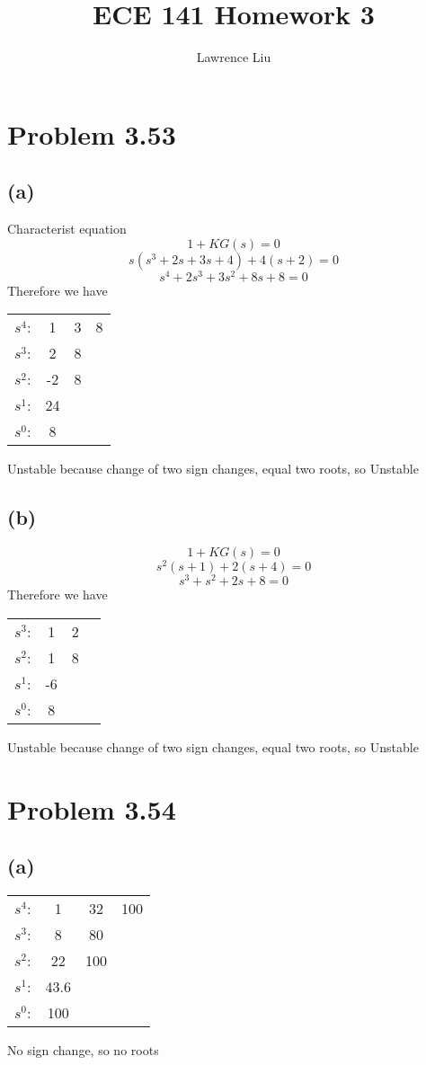 \documentclass[12pt]{article}
\title{ECE 141 Homework 3}
\author{Lawrence Liu}
\begin{document}
\maketitle
\section*{Problem 3.53}
\subsection*{(a)}
Characterist equation
$$1+KG(s)=0$$
$$s(s^3+2s+3s+4)+4(s+2)=0$$
$$s^4+2s^3+3s^2+8s+8=0$$
Therefore we have
\begin{center}
    \begin{tabular}{ c c c c} 
     $s^4$: & 1 & 3 &  8\\ 
     $s^3$: & 2 & 8 &  \\ 
     $s^2$: & -2 & 8&\\
     $s^1$:  & 24 & &\\
     $s^0$: & 8 & &
\end{tabular} 
\end{center}
Unstable because change of two sign changes, equal two roots, so Unstable
\subsection*{(b)}
$$1+KG(s)=0$$
$$s^2(s+1)+2(s+4)=0$$
$$s^3+s^2+2s+8=0$$
Therefore we have
\begin{center}
    \begin{tabular}{ c c c c} 
     $s^3$: & 1 & 2 &\\ 
     $s^2$: & 1 & 8&  \\ 
     $s^1$: & -6 & &\\
     $s^0$:  & 8 & &
\end{tabular} 
\end{center}
Unstable because change of two sign changes, equal two roots, so Unstable

\section*{Problem 3.54}
\subsection*{(a)}
\begin{center}
    \begin{tabular}{ c c c c} 
     $s^4$: & 1 & 32 & 100\\ 
     $s^3$: & 8 & 80&  \\ 
     $s^2$: & 22 & 100&\\
     $s^1$:  & 43.6 & &\\
     $s^0$: & 100 & &
\end{tabular} 
\end{center}
No sign change, so no roots
\end{document}
